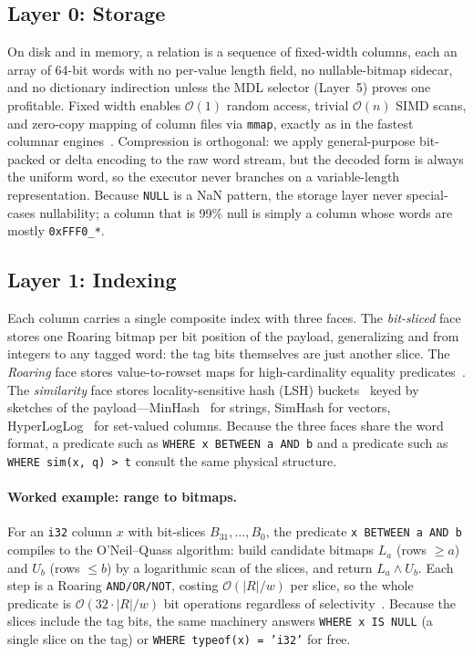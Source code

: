 \documentclass[10pt]{article}
\begin{document}
\subsection{Layer 0: Storage}
On disk and in memory, a relation is a sequence of fixed-width columns,
each an array of 64-bit words with no per-value length field, no
nullable-bitmap sidecar, and no dictionary indirection unless the MDL
selector (Layer~5) proves one profitable. Fixed width enables
$\mathcal{O}(1)$ random access, trivial $\mathcal{O}(n)$ SIMD scans,
and zero-copy mapping of column files via \texttt{mmap}, exactly as in
the fastest columnar engines~\citep{schulze2024clickhouse,willhalm2009simd}.
Compression is orthogonal: we apply general-purpose bit-packed or
delta encoding to the raw word stream, but the decoded form is always
the uniform word, so the executor never branches on a variable-length
representation. Because \texttt{NULL} is a NaN pattern, the storage
layer never special-cases nullability; a column that is 99\% null is
simply a column whose words are mostly \texttt{0xFFF0\_*}.

\subsection{Layer 1: Indexing}
Each column carries a single composite index with three faces. The
\emph{bit-sliced} face stores one Roaring bitmap per bit position of
the payload, generalizing \citet{oneil1997improved} and
\citet{chan1998bitmap} from integers to any tagged word: the tag bits
themselves are just another slice. The \emph{Roaring} face stores
value-to-rowset maps for high-cardinality equality
predicates~\citep{chambi2016roaring}. The \emph{similarity} face stores
locality-sensitive hash (LSH) buckets~\citep{andoni2008near} keyed by
sketches of the payload---MinHash~\citep{broder1997resemblance} for
strings, SimHash for vectors, HyperLogLog~\citep{flajolet2007hyperloglog}
for set-valued columns. Because the three faces share the word format,
a predicate such as \texttt{WHERE x BETWEEN a AND b} and a predicate
such as \texttt{WHERE sim(x, q) > t} consult the same physical
structure.

\paragraph{Worked example: range to bitmaps.}
For an \texttt{i32} column $x$ with bit-slices $B_{31},\dots,B_0$, the
predicate \texttt{x BETWEEN a AND b} compiles to the O'Neil--Quass
algorithm: build candidate bitmaps $L_a$ (rows $\geq a$) and $U_b$
(rows $\leq b$) by a logarithmic scan of the slices, and return
$L_a \wedge U_b$. Each step is a Roaring \texttt{AND/OR/NOT}, costing
$\mathcal{O}(|R|/w)$ per slice, so the whole predicate is
$\mathcal{O}(32\cdot|R|/w)$ bit operations regardless of
selectivity~\citep{oneil1997improved,chan1998bitmap,chambi2016roaring}.
Because the slices include the tag bits, the same machinery answers
\texttt{WHERE x IS NULL} (a single slice on the tag) or
\texttt{WHERE typeof(x) = 'i32'} for free.
\end{document}
